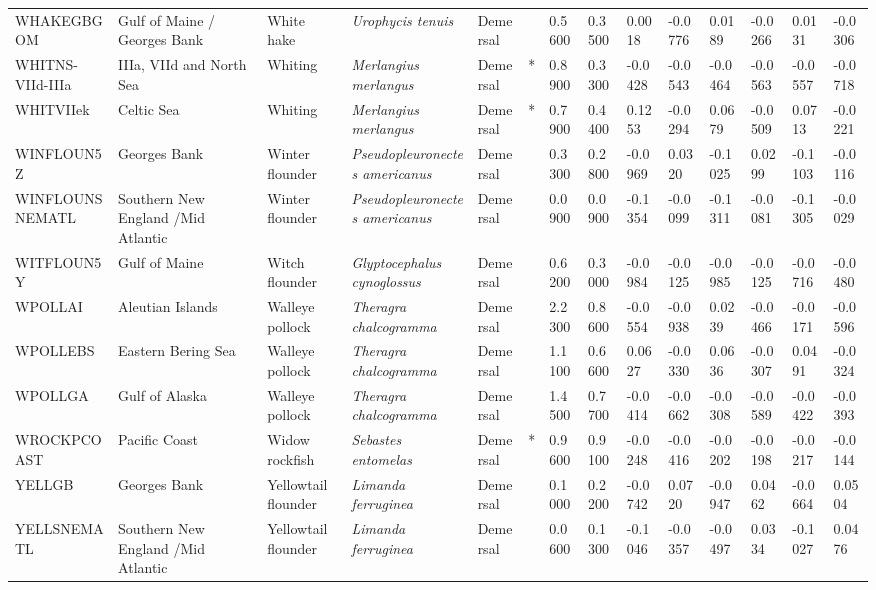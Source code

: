 \begin{longtable}{p{2.8cm}p{2cm}p{1.7cm}p{1.7cm}p{1cm}p{0.3cm}p{1cm}p{1cm}p{1cm}p{1cm}p{1cm}p{1cm}p{1cm}p{1cm}}
  WHAKEGBGOM & Gulf of Maine / Georges Bank & White hake & \textit{Urophycis tenuis} & Demersal &   & 0.5600 & 0.3500 & 0.0018 & -0.0776 & 0.0189 & -0.0266 & 0.0131 & -0.0306 \\ 
  WHITNS-VIId-IIIa & IIIa, VIId and North Sea & Whiting & \textit{Merlangius merlangus} & Demersal & * & 0.8900 & 0.3300 & -0.0428 & -0.0543 & -0.0464 & -0.0563 & -0.0557 & -0.0718 \\ 
  WHITVIIek & Celtic Sea & Whiting & \textit{Merlangius merlangus} & Demersal & * & 0.7900 & 0.4400 & 0.1253 & -0.0294 & 0.0679 & -0.0509 & 0.0713 & -0.0221 \\ 
  WINFLOUN5Z & Georges Bank & Winter flounder & \textit{Pseudopleuronectes americanus} & Demersal &   & 0.3300 & 0.2800 & -0.0969 & 0.0320 & -0.1025 & 0.0299 & -0.1103 & -0.0116 \\ 
  WINFLOUNSNEMATL & Southern New England /Mid Atlantic & Winter flounder & \textit{Pseudopleuronectes americanus} & Demersal &   & 0.0900 & 0.0900 & -0.1354 & -0.0099 & -0.1311 & -0.0081 & -0.1305 & -0.0029 \\ 
  WITFLOUN5Y & Gulf of Maine & Witch flounder & \textit{Glyptocephalus cynoglossus} & Demersal &   & 0.6200 & 0.3000 & -0.0984 & -0.0125 & -0.0985 & -0.0125 & -0.0716 & -0.0480 \\ 
  WPOLLAI & Aleutian Islands & Walleye pollock & \textit{Theragra chalcogramma} & Demersal &   & 2.2300 & 0.8600 & -0.0554 & -0.0938 & 0.0239 & -0.0466 & -0.0171 & -0.0596 \\ 
  WPOLLEBS & Eastern Bering Sea & Walleye pollock & \textit{Theragra chalcogramma} & Demersal &   & 1.1100 & 0.6600 & 0.0627 & -0.0330 & 0.0636 & -0.0307 & 0.0491 & -0.0324 \\ 
  WPOLLGA & Gulf of Alaska & Walleye pollock & \textit{Theragra chalcogramma} & Demersal &   & 1.4500 & 0.7700 & -0.0414 & -0.0662 & -0.0308 & -0.0589 & -0.0422 & -0.0393 \\ 
  WROCKPCOAST & Pacific Coast & Widow rockfish & \textit{Sebastes entomelas} & Demersal & * & 0.9600 & 0.9100 & -0.0248 & -0.0416 & -0.0202 & -0.0198 & -0.0217 & -0.0144 \\ 
  YELLGB & Georges Bank & Yellowtail flounder & \textit{Limanda ferruginea} & Demersal &   & 0.1000 & 0.2200 & -0.0742 & 0.0720 & -0.0947 & 0.0462 & -0.0664 & 0.0504 \\ 
  YELLSNEMATL & Southern New England /Mid Atlantic & Yellowtail flounder & \textit{Limanda ferruginea} & Demersal &   & 0.0600 & 0.1300 & -0.1046 & -0.0357 & -0.0497 & 0.0334 & -0.1027 & 0.0476 \\ 

\end{longtable}
